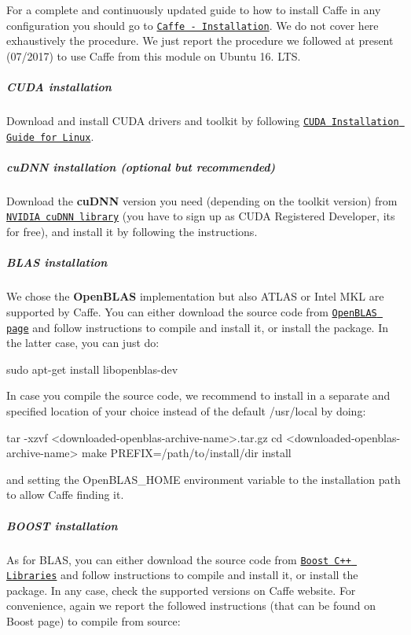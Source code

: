 For a complete and continuously updated guide to how to install Caffe in any configuration you should go to \href{http://caffe.berkeleyvision.org/installation.html}{\tt Caffe -\/ Installation}. We do not cover here exhaustively the procedure. We just report the procedure we followed at present (07/2017) to use Caffe from this module on Ubuntu 16. L\+TS.

\subparagraph*{C\+U\+DA installation}

Download and install C\+U\+DA drivers and toolkit by following \href{http://docs.nvidia.com/cuda/cuda-installation-guide-linux/#axzz4BkDT7m6r}{\tt C\+U\+DA Installation Guide for Linux}.

\subparagraph*{cu\+D\+NN installation (optional but recommended)}

Download the {\bfseries cu\+D\+NN} version you need (depending on the toolkit version) from \href{https://developer.nvidia.com/cuDNN}{\tt N\+V\+I\+D\+IA cu\+D\+NN library} (you have to sign up as C\+U\+DA Registered Developer, it\textquotesingle{}s for free), and install it by following the instructions.

\subparagraph*{B\+L\+AS installation}

We chose the {\bfseries Open\+B\+L\+AS} implementation but also A\+T\+L\+AS or Intel M\+KL are supported by Caffe. You can either download the source code from \href{http://www.openblas.net/}{\tt Open\+B\+L\+AS page} and follow instructions to compile and install it, or install the package. In the latter case, you can just do\+:


\begin{DoxyCode}
sudo apt-get install libopenblas-dev
\end{DoxyCode}


In case you compile the source code, we recommend to install in a separate and specified location of your choice instead of the default {\ttfamily /usr/local} by doing\+:


\begin{DoxyCode}
tar -xzvf <downloaded-openblas-archive-name>.tar.gz
cd <downloaded-openblas-archive-name>
make PREFIX=/path/to/install/dir install
\end{DoxyCode}
 and setting the {\ttfamily Open\+B\+L\+A\+S\+\_\+\+H\+O\+ME} environment variable to the installation path to allow Caffe finding it.

\subparagraph*{B\+O\+O\+ST installation}

As for B\+L\+AS, you can either download the source code from \href{http://www.boost.org/}{\tt Boost C++ Libraries} and follow instructions to compile and install it, or install the package. In any case, check the supported versions on Caffe website. For convenience, again we report the followed instructions (that can be found on Boost page) to compile from source\+:


